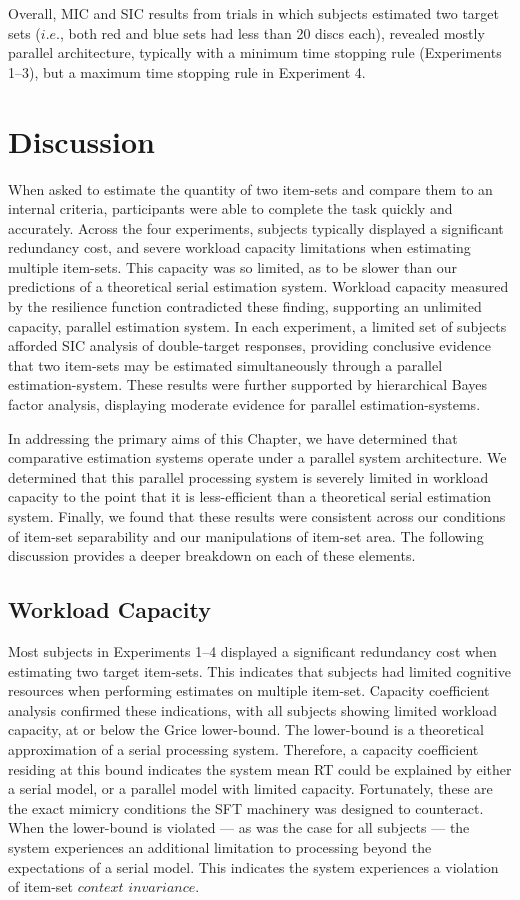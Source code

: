 Overall, MIC and SIC results from trials in which subjects estimated two target sets ($i$.$e$., both red and blue sets had less than 20 discs each), revealed mostly parallel architecture, typically with a minimum time stopping rule (Experiments 1--3), but a maximum time stopping rule in Experiment 4. 

\section{Discussion}
When asked to estimate the quantity of two item-sets and compare them to an internal criteria, participants were able to complete the task quickly and accurately. Across the four experiments, subjects typically displayed a significant redundancy cost, and severe workload capacity limitations when estimating multiple item-sets. This capacity was so limited, as to be slower than our predictions of a theoretical serial estimation system. Workload capacity measured by the resilience function contradicted these finding, supporting an unlimited capacity, parallel estimation system. In each experiment, a limited set of subjects afforded SIC analysis of double-target responses, providing conclusive evidence that two item-sets may be estimated simultaneously through a parallel estimation-system. These results were further supported by hierarchical Bayes factor analysis, displaying moderate evidence for parallel estimation-systems.

In addressing the primary aims of this Chapter, we have determined that comparative estimation systems operate under a parallel system architecture. We determined that this parallel processing system is severely limited in workload capacity to the point that it is less-efficient than a theoretical serial estimation system. Finally, we found that these results were consistent across our conditions of item-set separability and our manipulations of item-set area. The following discussion provides a deeper breakdown on each of these elements.

\subsection{Workload Capacity}
Most subjects in Experiments 1--4 displayed a significant redundancy cost when estimating two target item-sets. This indicates that subjects had limited cognitive resources when performing estimates on multiple item-set. Capacity coefficient analysis confirmed these indications, with all subjects showing limited workload capacity, at or below the Grice lower-bound. The lower-bound is a theoretical approximation of a serial processing system. Therefore, a capacity coefficient residing at this bound indicates the system mean RT could be explained by either a serial model, or a parallel model with limited capacity. Fortunately, these are the exact mimicry conditions the SFT machinery was designed to counteract. When the lower-bound is violated --- as was the case for all subjects --- the system experiences an additional limitation to processing beyond the expectations of a serial model. This indicates the system experiences a violation of item-set $context$ $invariance$.

